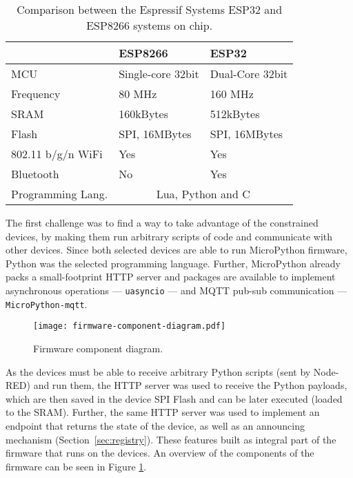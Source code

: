 \begin{table}[]
\centering
\caption{Comparison between the Espressif Systems ESP32 and ESP8266 systems on chip.}
\begin{tabular}{@{}lll@{}}
\toprule
                & \textbf{ESP8266}                   & \textbf{ESP32}                       \\ \midrule
MCU                & Single-core 32bit         & Dual-Core 32bit \\
Frequency          & 80 MHz                    & 160 MHz                     \\
SRAM               & 160kBytes                 & 512kBytes                   \\
Flash              & SPI, 16MBytes             & SPI, 16MBytes               \\
802.11 b/g/n WiFi  & Yes                       & Yes                         \\
Bluetooth          & No                        & Yes                         \\
Programming Lang.  & \multicolumn{2}{c}{Lua, Python and C} \\ \bottomrule
\end{tabular}
\label{tab:esps}
\end{table}

The first challenge was to find a way to take advantage of the constrained devices, by making them run arbitrary scripts of code and communicate with other devices. Since both selected devices are able to run MicroPython firmware, Python was the selected programming language. Further, MicroPython already packs a small-footprint HTTP server and packages are available to implement asynchronous operations --- \ie \texttt{uasyncio} --- and MQTT pub-sub communication --- \ie \texttt{MicroPython-mqtt}.

\begin{figure}[h]
    \centering
    \texttt{[image: firmware-component-diagram.pdf]}
    \caption{Firmware component diagram.}
    \label{fig:firmware_component_diagram}
\end{figure}

As the devices must be able to receive arbitrary Python scripts (sent by Node-RED) and run them, the HTTP server was used to receive the Python payloads, which are then saved in the device SPI Flash and can be later executed (loaded to the SRAM). Further, the same HTTP server was used to implement an endpoint that returns the state of the device, as well as an announcing mechanism (\cf Section~\ref{sec:registry}). These features built as integral part of the firmware that runs on the devices. An overview of the components of the firmware can be seen in Figure \ref{fig:firmware_component_diagram}.

